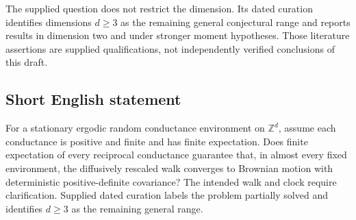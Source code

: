 \documentclass[11pt]{article}
\newcommand{\Z}{\mathbb{Z}}
\begin{document}
The supplied question does not restrict the dimension. Its dated curation identifies dimensions \(d\geq3\) as the remaining general conjectural range and reports results in dimension two and under stronger moment hypotheses. Those literature assertions are supplied qualifications, not independently verified conclusions of this draft.
\subsection{Short English statement}
For a stationary ergodic random conductance environment on \(\Z^d\), assume each conductance is positive and finite and has finite expectation. Does finite expectation of every reciprocal conductance guarantee that, in almost every fixed environment, the diffusively rescaled walk converges to Brownian motion with deterministic positive-definite covariance? The intended walk and clock require clarification. Supplied dated curation labels the problem partially solved and identifies \(d\geq3\) as the remaining general range.
\end{document}
